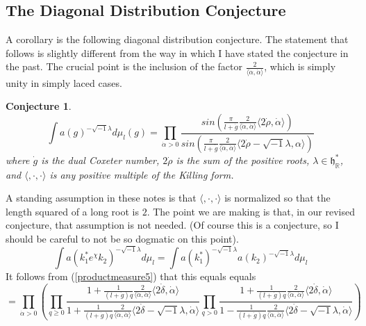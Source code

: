 \documentclass{amsart}
\theoremstyle{conjecture}
\newtheorem{conjecture}{Conjecture}
\theoremstyle{definition}
\theoremstyle{question}
\theoremstyle{questions}
\theoremstyle{remark}
\theoremstyle{remarks}
\theoremstyle{example}
\numberwithin{equation}{section}
\begin{document}
\subsection{The Diagonal Distribution Conjecture}\label{Diagdistribution}

A corollary is the following diagonal distribution conjecture. The statement that follows is slightly different from
the way in which I have stated the conjecture in the past. The crucial point is the inclusion of the factor
 $\frac{2}{\langle\dot\alpha,\dot\alpha\rangle}$, which is simply unity in simply laced cases.

\begin{conjecture}
$$\int a(g)^{-\sqrt{-1}\lambda}d\mu_{l}(g)=\prod_{\dot\alpha >0}\frac {sin(\frac {\pi}{l+\dot {g}}\frac{2}{\langle\dot\alpha,\dot\alpha\rangle}\langle 2\dot \rho
,\dot\alpha\rangle )}{sin(\frac {\pi}{l+\dot {g}}\frac{2}{\langle\dot\alpha,\dot\alpha\rangle}\langle 2\dot\rho -\sqrt{-1}\lambda
,\alpha\rangle )} $$
where $\dot {g}$ is the dual Coxeter number, $2\dot\rho$ is the sum of the
positive roots, $\lambda\in \mathfrak h_{\mathbb R}^{*}$, and $\langle,\cdot,\cdot\rangle$
is any positive multiple of the Killing form.
\end{conjecture}

A standing assumption in these notes is that $\langle,\cdot,\cdot\rangle$ is normalized so that the length squared
of a long root is $2$. The point we are making is that, in our revised conjecture, that assumption is not needed.
(Of course this is a conjecture, so I should be careful to not be so dogmatic on this point).\\


$$\int a(k_1^*e^{\chi }k_2)^{-\sqrt{-1}\lambda}d\mu_l=\int a(k_1^*)^{-\sqrt{-1}\lambda}a(k_2)^{-\sqrt{-1}\lambda}d\mu_l$$
It follows from (\ref{productmeasure5}) that this equals
equals
\begin{equation}=\prod_{\dot \alpha>0}\left(\prod_{q\ge 0}
\frac{1+\frac{1}{(l+\dot g)q}\frac{2}{\langle\dot\alpha,\dot\alpha\rangle}\langle 2\dot\delta,\dot\alpha\rangle}{1+\frac{1}{(l+\dot g)q}\frac{2}{\langle\dot\alpha,\dot\alpha\rangle}\langle 2\dot\delta-\sqrt{-1}\lambda,\dot\alpha\rangle}
\prod_{q> 0}\frac{1+\frac{1}{(l+\dot g)q}\frac{2}{\langle\dot\alpha,\dot\alpha\rangle}\langle 2\dot\delta,\dot\alpha\rangle}{1-\frac{1}{(l+\dot g)q}\frac{2}{\langle\dot\alpha,\dot\alpha\rangle}\langle 2\dot\delta-\sqrt{-1}\lambda,\dot\alpha\rangle}\right)
\end{equation}
\end{document}
